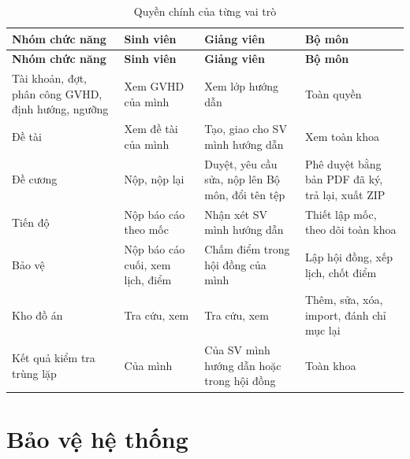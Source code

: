 \documentclass[../main.tex]{subfiles}
\begin{document}
{\renewcommand{\arraystretch}{1.15}
\begin{longtable}{|p{4.6cm}|p{2.9cm}|p{3.4cm}|p{3.4cm}|}
\caption{Quyền chính của từng vai trò}\label{tab:c4-phan-quyen}\\
\hline
\textbf{Nhóm chức năng} & \textbf{Sinh viên} & \textbf{Giảng viên} & \textbf{Bộ môn} \\
\hline
\endfirsthead
\hline
\textbf{Nhóm chức năng} & \textbf{Sinh viên} & \textbf{Giảng viên} & \textbf{Bộ môn} \\
\hline
\endhead
Tài khoản, đợt, phân công GVHD, định hướng, ngưỡng & Xem GVHD của mình & Xem lớp hướng dẫn & Toàn quyền \\
\hline
Đề tài & Xem đề tài của mình & Tạo, giao cho SV mình hướng dẫn & Xem toàn khoa \\
\hline
Đề cương & Nộp, nộp lại & Duyệt, yêu cầu sửa, nộp lên Bộ môn, đổi tên tệp & Phê duyệt bằng bản PDF đã ký, trả lại, xuất ZIP \\
\hline
Tiến độ & Nộp báo cáo theo mốc & Nhận xét SV mình hướng dẫn & Thiết lập mốc, theo dõi toàn khoa \\
\hline
Bảo vệ & Nộp báo cáo cuối, xem lịch, điểm & Chấm điểm trong hội đồng của mình & Lập hội đồng, xếp lịch, chốt điểm \\
\hline
Kho đồ án & Tra cứu, xem & Tra cứu, xem & Thêm, sửa, xóa, import, đánh chỉ mục lại \\
\hline
Kết quả kiểm tra trùng lặp & Của mình & Của SV mình hướng dẫn hoặc trong hội đồng & Toàn khoa \\
\hline
\end{longtable}
}

\section{Bảo vệ hệ thống}\label{sec:c4-bao-ve}
\end{document}
